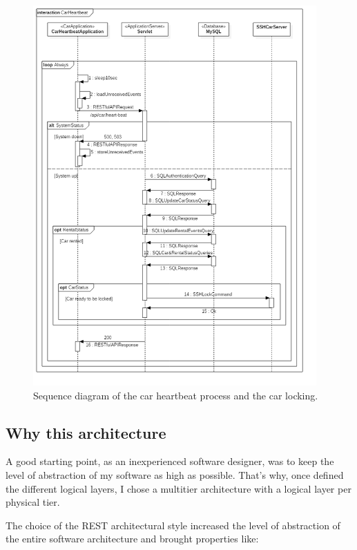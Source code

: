 \begin{figure}[H]
	\noindent
    	\centering
    	\includegraphics[height=550px, keepaspectratio]{diagrams/SequenceCarHeartbeat.png}
	\caption{Sequence diagram of the car heartbeat process and the car locking.}
    	\label{fig:sequence-heartbeat}
\end{figure}

\subsection{Why this architecture}

A good starting point, as an inexperienced software designer, was to keep the level of abstraction of my software as high as possible. That's why, once defined the different logical layers, I chose a multitier architecture with a logical layer per physical tier.

The choice of the REST architectural style increased the level of abstraction of the entire software architecture and brought properties like:


